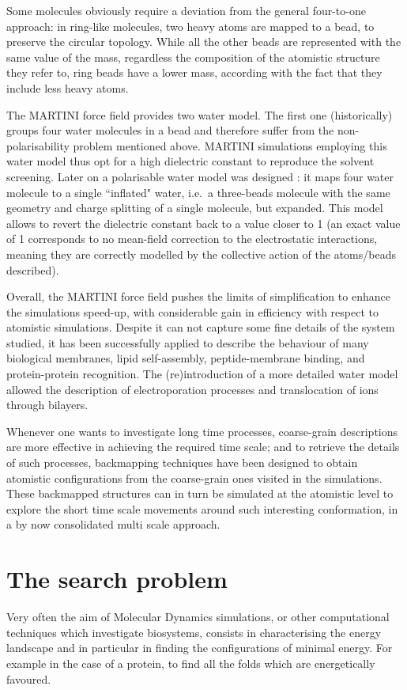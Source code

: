 Some molecules obviously require a deviation from the general four-to-one approach: in ring-like molecules, two heavy atoms are mapped to a bead, to preserve the circular topology. While all the other beads are represented with the same value of the mass, regardless the composition of the atomistic structure they refer to, ring beads have a lower mass, according with the fact that they include less heavy atoms.

The MARTINI force field provides two water model. The first one (historically) groups four water molecules in a bead and therefore suffer from the non-polarisability problem mentioned above. MARTINI simulations employing this water model thus opt for a high dielectric constant to reproduce the solvent screening. Later on a polarisable water model was designed \cite{Yesylevskyy2010}: it maps four water molecule to a single ``inflated" water, i.e.\ a three-beads molecule with the same geometry and charge splitting of a single molecule, but expanded. This model allows to revert the dielectric constant back to a value closer to 1 (an exact value of 1 corresponds to no mean-field correction to the electrostatic interactions, meaning they are correctly modelled by the collective action of the atoms/beads described).

Overall, the MARTINI force field pushes the limits of simplification to enhance the simulations speed-up, with considerable gain in efficiency with respect to atomistic simulations. Despite it can not capture some fine details of the system studied, it has been successfully applied to describe the behaviour of many biological membranes, lipid self-assembly, peptide-membrane binding, and protein-protein recognition. The (re)introduction of a more detailed water model allowed the description of electroporation processes and translocation of ions through bilayers.

Whenever one wants to investigate long time processes, coarse-grain descriptions are more effective in achieving the required time scale; and to retrieve the details of such processes, backmapping techniques have been designed to obtain atomistic configurations from the coarse-grain ones visited in the simulations. These backmapped structures can in turn be simulated at the atomistic level to explore the short time scale movements around such interesting conformation, in a by now consolidated multi scale approach.


  
\section{The search problem} \label{sec:search}
Very often the aim of Molecular Dynamics simulations, or other computational techniques which investigate biosystems, consists in characterising the energy landscape and in particular in finding the configurations of minimal energy. For example in the case of a protein, to find all the folds which are energetically favoured.

